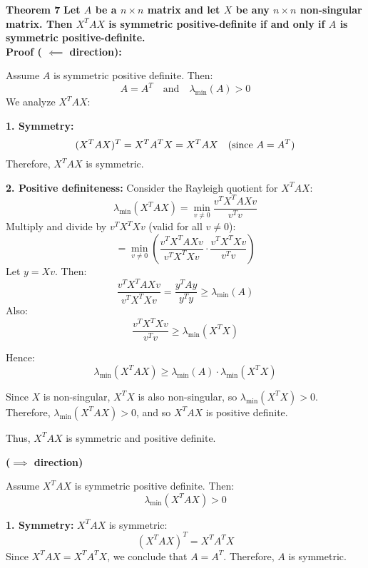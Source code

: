 \documentclass[aspectratio=169]{beamer}
\begin{document}
\begin{frame}{\textbf{Theorem 7}}
\textbf{
Let \( A \) be a \( n \times n \) matrix and let \( X \) be any \( n \times n \) non-singular matrix. Then \( X^T A X \) is symmetric positive-definite if and only if \( A \) is symmetric positive-definite.}
\\
\textbf{Proof ( \( \impliedby\) direction):}

Assume \( A \) is symmetric positive definite. Then:
\[
A = A^T \quad \text{and} \quad \lambda_{\min}(A) > 0
\]
We analyze \( X^T A X \):

\textbf{1. Symmetry:  }
   \[
   (X^T A X)^T = X^T A^T X = X^T A X \quad \text{(since \( A = A^T \))}
   \]
   Therefore, \( X^T A X \) is symmetric.
\end{frame}
\begin{frame}
    

\textbf{2. Positive definiteness:}  
   Consider the Rayleigh quotient for \( X^T A X \):
   \[
   \lambda_{\min}(X^T A X) = \min_{v \neq 0} \frac{v^T X^T A X v}{v^T v}
   \]
   Multiply and divide by \( v^T X^T X v \) (valid for all \( v \neq 0 \)):
   \[
   = \min_{v \neq 0} \left( \frac{v^T X^T A X v}{v^T X^T X v} \cdot \frac{v^T X^T X v}{v^T v} \right)
   \]
   Let \( y = Xv \). Then:
   \[
   \frac{v^T X^T A X v}{v^T X^T X v} = \frac{y^T A y}{y^T y} \ge \lambda_{\min}(A)
   \]
   Also:
   \[
   \frac{v^T X^T X v}{v^T v} \ge \lambda_{\min}(X^T X)
   \]

\end{frame}
\begin{frame}
   Hence:
   \[
   \lambda_{\min}(X^T A X) \ge \lambda_{\min}(A) \cdot \lambda_{\min}(X^T X)
   \]

   Since \( X \) is non-singular, \( X^T X \) is also non-singular, so \( \lambda_{\min}(X^T X) > 0 \).  
   Therefore, \( \lambda_{\min}(X^T A X) > 0 \), and so \( X^T A X \) is positive definite.

Thus, \( X^T A X \) is symmetric and positive definite.

    
\vspace{3mm}
\textbf{(\(\implies\) direction)}

Assume \( X^T A X \) is symmetric positive definite. Then:
\[
\lambda_{\min}(X^T A X) > 0
\]

\textbf{1. Symmetry: } 
   \( X^T A X \) is symmetric:
   \[
   (X^T A X)^T = X^T A^T X
   \]
   Since \( X^T A X = X^T A^T X \), we conclude that \( A = A^T \).  
   Therefore, \( A \) is symmetric.
\end{frame}
\end{document}

